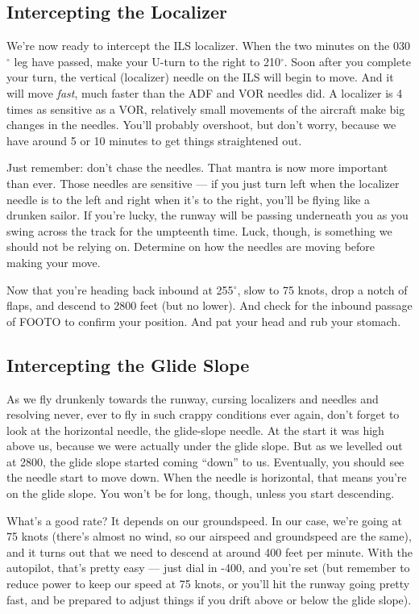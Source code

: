 \subsection{Intercepting the Localizer}

We're now ready to intercept the ILS localizer.  When the two minutes
on the 030$^\circ$ leg have passed, make your U-turn to the right to
210$^\circ$.  Soon after you complete your turn, the vertical
(localizer) needle on the ILS will begin to move.  And it will move
\emph{fast}, much faster than the ADF and VOR needles did.  A
localizer is 4 times as sensitive as a VOR, relatively small movements
of the aircraft make big changes in the needles.  You'll probably
overshoot, but don't worry, because we have around 5 or 10 minutes to
get things straightened out.

Just remember: don't chase the needles.  That mantra is now more
important than ever.  Those needles are sensitive --- if you just turn
left when the localizer needle is to the left and right when it's to
the right, you'll be flying like a drunken sailor.  If you're lucky,
the runway will be passing underneath you as you swing across the
track for the umpteenth time.  Luck, though, is something we should
not be relying on.  Determine on how the needles are moving before
making your move.

Now that you're heading back inbound at 255$^\circ$, slow to 75 knots,
drop a notch of flaps, and descend to 2800 feet (but no lower).  And
check for the inbound passage of FOOTO to confirm your position.  And
pat your head and rub your stomach.

\subsection{Intercepting the Glide Slope}

As we fly drunkenly towards the runway, cursing localizers and needles
and resolving never, ever to fly in such crappy conditions ever again,
don't forget to look at the horizontal needle, the glide-slope needle.
At the start it was high above us, because we were actually under the
glide slope.  But as we levelled out at 2800, the glide slope started
coming ``down'' to us.  Eventually, you should see the needle start to
move down.  When the needle is horizontal, that means you're on the
glide slope.  You won't be for long, though, unless you start
descending.

What's a good rate?  It depends on our groundspeed.  In our case,
we're going at 75 knots (there's almost no wind, so our airspeed and
groundspeed are the same), and it turns out that we need to descend at
around 400 feet per minute.  With the autopilot, that's pretty easy
--- just dial in -400, and you're set (but remember to reduce power to
keep our speed at 75 knots, or you'll hit the runway going pretty
fast, and be prepared to adjust things if you drift above or below the
glide slope).

